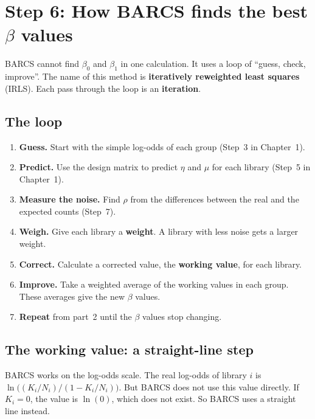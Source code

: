 \section{Step 6: How BARCS finds the best \texorpdfstring{$\beta$}{beta} values}

BARCS cannot find $\beta_0$ and $\beta_1$ in one calculation. It uses a loop
of ``guess, check, improve''. The name of this method is
\textbf{iteratively reweighted least squares} (IRLS). Each pass through the
loop is an \textbf{iteration}.

\subsection{The loop}

\begin{enumerate}
\item \textbf{Guess.} Start with the simple log-odds of each group
  (Step~3 in Chapter~1).
\item \textbf{Predict.} Use the design matrix to predict $\eta$ and $\mu$
  for each library (Step~5 in Chapter~1).
\item \textbf{Measure the noise.} Find $\rho$ from the differences between
  the real and the expected counts (Step~7).
\item \textbf{Weigh.} Give each library a \textbf{weight}. A library with
  less noise gets a larger weight.
\item \textbf{Correct.} Calculate a corrected value, the \textbf{working
  value}, for each library.
\item \textbf{Improve.} Take a weighted average of the working values in each
  group. These averages give the new $\beta$ values.
\item \textbf{Repeat} from part~2 until the $\beta$ values stop changing.
\end{enumerate}

\subsection{The working value: a straight-line step}

BARCS works on the log-odds scale. The real log-odds of library $i$ is
$\ln\bigl((K_i/N_i) / (1 - K_i/N_i)\bigr)$. But BARCS does not use this value
directly. If $K_i = 0$, the value is $\ln(0)$, which does not exist. So BARCS
uses a straight line instead.

